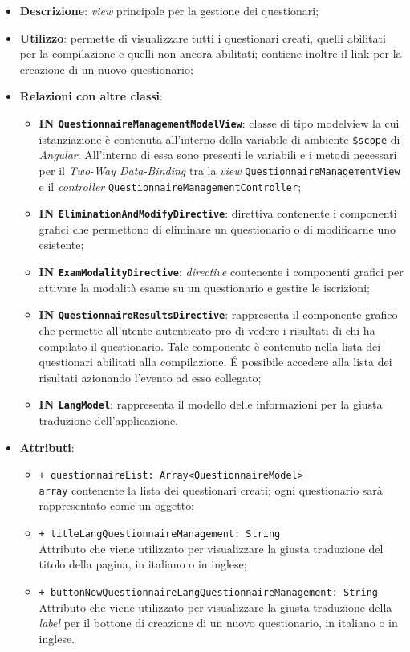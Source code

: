 \begin{itemize}
	\item \textbf{Descrizione}: \textit{view} principale per la gestione dei questionari;
	\item \textbf{Utilizzo}: permette di visualizzare tutti i questionari creati, quelli abilitati per la compilazione e quelli non ancora abilitati; contiene inoltre il link per la creazione di un nuovo questionario;
	\item \textbf{Relazioni con altre classi}:
	\begin{itemize}
		\item \textbf{IN \texttt{QuestionnaireManagementModelView}}: classe di tipo modelview la cui istanziazione è contenuta all'interno della variabile di ambiente \texttt{\$scope} di \textit{Angular}. All'interno di essa sono presenti le variabili e i metodi necessari per il \textit{Two-Way Data-Binding} tra la \textit{view} \texttt{QuestionnaireManagementView} e il \textit{controller} \texttt{QuestionnaireManagementController};
		\item \textbf{IN \texttt{EliminationAndModifyDirective}}: direttiva contenente i componenti grafici  che permettono di eliminare un questionario o di modificarne uno esistente;
		\item \textbf{IN \texttt{ExamModalityDirective}}: \textit{directive} contenente i componenti grafici per attivare la modalità esame su un questionario e gestire le iscrizioni;
		\item \textbf{IN \texttt{QuestionnaireResultsDirective}}: rappresenta il componente grafico che permette all'utente autenticato pro di vedere i risultati di chi ha compilato il questionario. Tale componente è contenuto nella lista dei questionari abilitati alla compilazione. \'E possibile accedere alla lista dei risultati azionando l'evento ad esso collegato;
		\item \textbf{IN \texttt{LangModel}}: rappresenta il modello delle informazioni per la giusta traduzione dell'applicazione.
	\end{itemize}
		\item \textbf{Attributi}:
		\begin{itemize}
			\item \texttt{+ questionnaireList: Array<QuestionnaireModel>} \\ \texttt{array} contenente la lista dei questionari creati; ogni questionario sarà rappresentato come un oggetto;
			\item \texttt{+ titleLangQuestionnaireManagement: String} \\ Attributo che viene utilizzato per visualizzare la giusta traduzione del titolo della pagina, in italiano o in inglese;
			\item \texttt{+ buttonNewQuestionnaireLangQuestionnaireManagement: String} \\ Attributo che viene utilizzato per visualizzare la giusta traduzione della \textit{label} per il bottone di creazione di un nuovo questionario, in italiano o in inglese.
		\end{itemize}
\end{itemize}
